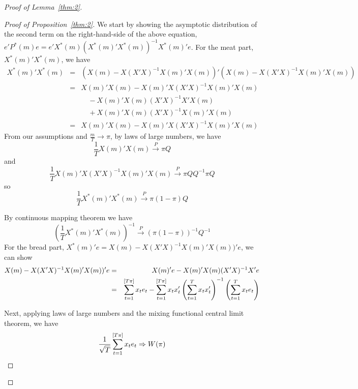 \begin{proof}[Proof of Lemma~\ref{thm:2}]
\begin{proof}[Proof of Proposition~\ref{thm:2}]
\noindent We start by showing the asymptotic distribution of the second term on the right-hand-side of the above equation, $e'P^{*}(m)e = e'X^{*}(m)(X^{*}(m)'X^{*}(m))^{-1}X^{*}(m)'e$. For the meat part, $X^{*}(m)'X^{*}(m)$, we have
    \begin{eqnarray*}
    X^{*}(m)'X^{*}(m) & = & (X(m)-X(X'X)^{-1}X(m)'X(m))'(X(m)-X(X'X)^{-1}X(m)'X(m)) \\
                      & = & X(m)'X(m) - X(m)'X(X'X)^{-1}X(m)'X(m) \\
    				  &   & \quad - X(m)'X(m)(X'X)^{-1}X'X(m) \\
                      &   & \quad + X(m)'X(m)(X'X)^{-1}X(m)'X(m) \\
    				  & = & X(m)'X(m) - X(m)'X(X'X)^{-1}X(m)'X(m)
    \end{eqnarray*}
\noindent From our assumptions and $\frac{m}{T} \rightarrow \pi$, by laws of large numbers, we have
    \begin{equation*}
        \frac{1}{T} X(m)'X(m) \stackrel{P}{\rightarrow} \pi Q
    \end{equation*}
and
    \begin{equation*}
        \frac{1}{T} X(m)'X(X'X)^{-1}X(m)'X(m) \stackrel{P}{\rightarrow} \pi QQ^{-1} \pi Q
    \end{equation*}
so 
    \begin{equation*}
        \frac{1}{T} X^{*}(m)'X^{*}(m) \stackrel{P}{\rightarrow} \pi (1-\pi)Q
    \end{equation*}

\noindent By continuous mapping theorem we have 
    \begin{equation*}
        (\frac{1}{T} X^{*}(m)'X^{*}(m))^{-1}\stackrel{P}{\rightarrow}(\pi (1-\pi))^{-1}Q^{-1}
    \end{equation*}
\noindent For the bread part, $X^{*}(m)'e = X(m) - X(X'X)^{-1}X(m)'X(m))'e$, we can show 
    \begin{eqnarray*}
         X(m) - X(X'X)^{-1}X(m)'X(m))'e & = & X(m)'e - X(m)'X(m)(X'X)^{-1}X'e \\
                                        & = & \sum_{t=1}^{[T \pi]} x_t e_t - \sum_{t=1}^{[T \pi]} x_t x_t' \left( \sum_{t=1}^{T} x_t x_t' \right) ^{-1} \left( \sum_{t=1}^{T} x_t e_t \right)
    \end{eqnarray*}

\noindent Next, applying laws of large numbers and the mixing functional central limit theorem, we have
    \begin{equation*}
        \frac{1}{\sqrt{T}} \sum_{t=1}^{[T \pi]} x_t e_t \Rightarrow W(\pi)
    \end{equation*}
        

\end{proof}
\end{proof}
